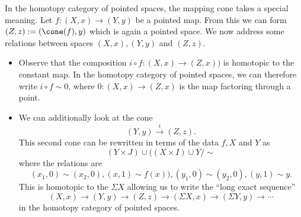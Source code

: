 
 
    In the homotopy category of pointed spaces, the mapping cone takes a special meaning. Let $f: (X,x)\to (Y, y)$ be a pointed map. From this we can form $(Z, z):=(\cone(f), y)$ which is again a pointed space. We now address some relations between spaces $(X, x), (Y, y)$ and $(Z, z)$.
\begin{itemize}
    \item Observe that the composition \(i\circ f: (X, x)\to (Z, x))\) is homotopic to the constant map. In the homotopy category of pointed spaces, we can therefore write $i\circ f \sim 0$, where $0: (X, x)\to (Z, x)$ is the map factoring through a point.
    \item We can additionally look at the cone  
    \[(Y, y)\xrightarrow{i}(Z, z).\]
    This second cone can be rewritten in terms of the data $f, X$ and $Y$ as
    \[ (Y\times J)\cup ((X\times I)\cup Y / \sim\]
    where the relations are 
    \[(x_1, 0)\sim (x_2, 0) , (x, 1)\sim f(x)) , (y_1, 0)\sim (y_2, 0), (y, 1)\sim y.\]
    This is homotopic to the  $\Sigma X$ allowing us to write the ``long exact sequence''
    \[(X, x)\to (Y, y)\to (Z, z)\to (\Sigma X, x)\to (\Sigma Y, y)\to \cdots\]
    in the homotopy category of pointed spaces.
\end{itemize}

 